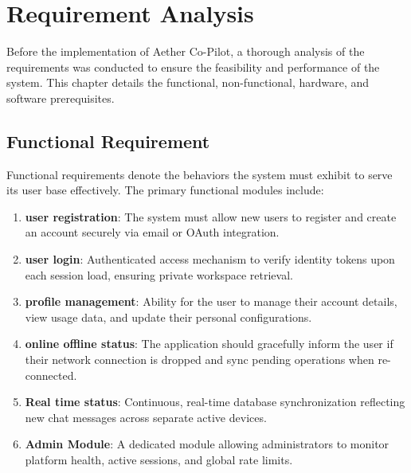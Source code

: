 \chapter{Requirement Analysis}

Before the implementation of Aether Co-Pilot, a thorough analysis of the requirements was conducted to ensure the feasibility and performance of the system. This chapter details the functional, non-functional, hardware, and software prerequisites.

\section{Functional Requirement}
Functional requirements denote the behaviors the system must exhibit to serve its user base effectively. The primary functional modules include:
\begin{enumerate}
    \item \textbf{user registration}: The system must allow new users to register and create an account securely via email or OAuth integration.
    \item \textbf{user login}: Authenticated access mechanism to verify identity tokens upon each session load, ensuring private workspace retrieval.
    \item \textbf{profile management}: Ability for the user to manage their account details, view usage data, and update their personal configurations.
    \item \textbf{online offline status}: The application should gracefully inform the user if their network connection is dropped and sync pending operations when re-connected.
    \item \textbf{Real time status}: Continuous, real-time database synchronization reflecting new chat messages across separate active devices.
    \item \textbf{Admin Module}: A dedicated module allowing administrators to monitor platform health, active sessions, and global rate limits.
\end{enumerate}


